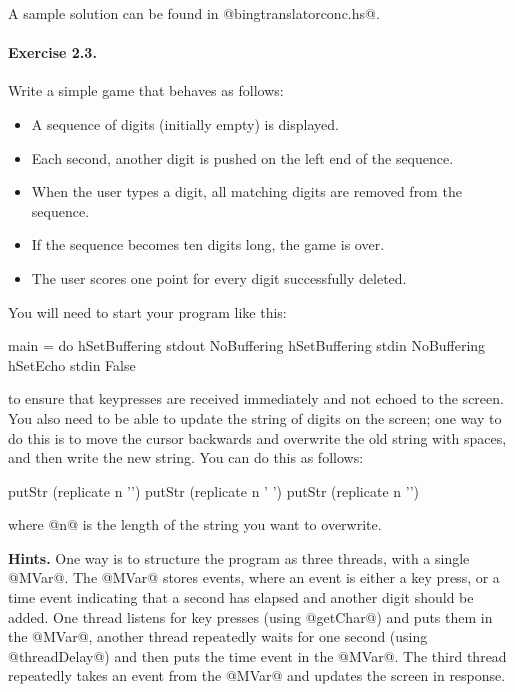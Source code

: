 \documentclass[11pt,a4paper]{article}
\begin{document}
A sample solution can be found in @bingtranslatorconc.hs@.

\paragraph{Exercise 2.3.} Write a simple game that behaves as follows:
\begin{itemize}
\item A sequence of digits (initially empty) is displayed.
\item Each second, another digit is pushed on the left end of the sequence.
\item When the user types a digit, all matching digits are removed from the sequence.
\item If the sequence becomes ten digits long, the game is over.
\item The user scores one point for every digit successfully deleted.
\end{itemize}

You will need to start your program like this:

\begin{haskell}
main = do
 hSetBuffering stdout NoBuffering
 hSetBuffering stdin NoBuffering
 hSetEcho stdin False
\end{haskell}

\noindent to ensure that keypresses are received immediately and not
echoed to the screen.  You also need to be able to update the string
of digits on the screen; one way to do this is to move the cursor
backwards and overwrite the old string with spaces, and then write the
new string.  You can do this as follows:

\begin{haskell}
     putStr (replicate n '\8')
     putStr (replicate n ' ')
     putStr (replicate n '\8')
\end{haskell}

\noindent where @n@ is the length of the string you want to overwrite.

\textbf{Hints.}  One way is to structure the program as three threads,
with a single @MVar@.  The @MVar@ stores events, where an event is
either a key press, or a time event indicating that a second has elapsed and
another digit should be added.  One thread listens for key presses
(using @getChar@) and puts them in the @MVar@, another thread repeatedly
waits for one second (using @threadDelay@) and then puts the time
event in the @MVar@.  The third thread repeatedly takes an event from
the @MVar@ and updates the screen in response.
\end{document}

